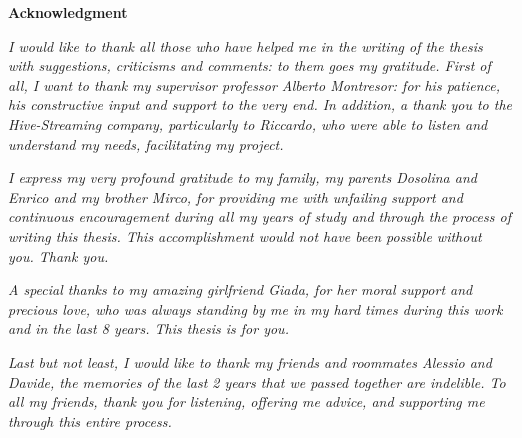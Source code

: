\thispagestyle{empty}

\begin{center}
  {\bf \Huge Acknowledgment}
\end{center}

\vspace{4cm}


\emph{
  	I would like to thank all those who have helped me in the writing of the thesis with suggestions, criticisms and comments: to them goes my gratitude.
	First of all, I want to thank my supervisor professor Alberto Montresor: for his patience, his constructive input and support to the very end.
	In addition, a thank you to the Hive-Streaming company, particularly to Riccardo, who were able to listen and understand my needs, facilitating my project.
}

\emph{
	I express my very profound gratitude to my family, my parents Dosolina and Enrico and my brother Mirco, for providing me with unfailing support and continuous encouragement during all my years of study and through the process of writing this thesis. This accomplishment would not have been possible without you. Thank you.
}

\emph{
	A special thanks to my amazing girlfriend Giada, for her moral support and precious love, who was always standing by me in my hard times during this work and in the last 8 years. This thesis is for you.
}

\emph{
	Last but not least, I would like to thank my friends and roommates Alessio and Davide, the memories of the last 2 years that we passed together are indelible. To all my friends, thank you for listening, offering me advice, and supporting me through this entire process.
}